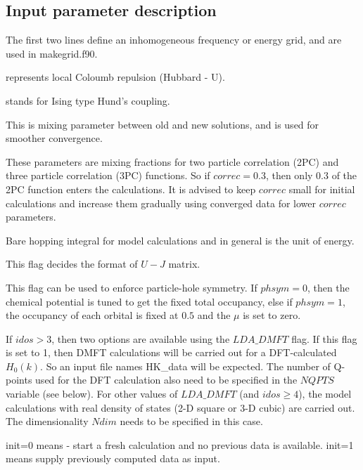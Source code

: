 \documentclass[a4paper]{article}
\begin{document}
\subsection{Input parameter description}
 \begin{description}
 
  \item The first two lines define an inhomogeneous frequency or energy grid, and are used in
  makegrid.f90. 
  \item [$U$:] represents local Coloumb repulsion (Hubbard - U).
  \item [$J_H$:] stands for Ising type Hund's coupling.
  \item [$dfac$:] This is mixing parameter between old and new solutions, and is used
  for smoother convergence.
  \item [$correc$, $correc2$ :] These parameters are mixing fractions for two particle correlation (2PC) and three particle correlation (3PC) functions. So if $correc=0.3$,
  then only 0.3 of the 2PC function enters the calculations. It is advised to keep
  $correc$ small for initial calculations and increase them gradually using converged data for lower $correc$ parameters. 
  \item [$t$:] Bare hopping integral for model calculations and in general is the unit of energy.
  \item [$Jflag$:] This flag decides the format of $U-J$ matrix.
 
 \item[$phsym$:] This flag can be used to enforce particle-hole symmetry. If $phsym=0$,
 then the chemical potential is tuned to get the fixed total occupancy, else if
 $phsym=1$, the occupancy of each orbital is fixed at $0.5$ and the $\mu$ is set
 to zero. 

\item[$LDA\_DMFT$:] If $idos > 3$, then two options are available using the
$LDA\_DMFT$ flag. If this flag is set to 1, then DMFT calculations will be carried out for a DFT-calculated $H_0(k)$. So an input file names HK\_data will be expected.
The number of Q-points used for the DFT calculation also need to be specified in the
$NQPTS$ variable (see below). For other values of $LDA\_DMFT$ (and $idos \ge 4$),
the model calculations with real density of states (2-D square or 3-D cubic) 
are carried out. The dimensionality $Ndim$ needs to be specified in this case.



  \item [$init$:] init=0 means - start a fresh calculation and no previous data is available. init=1 means supply previously computed data as input.


\end{description}
\end{document}

